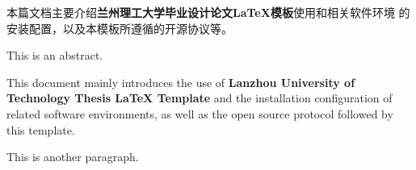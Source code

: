 
\begin{abstractzh}
	本篇文档主要介绍{\bf 兰州理工大学毕业设计论文\LaTeX{}模板}使用和相关软件环境
	的安装配置，以及本模板所遵循的开源协议等。
\end{abstractzh}

\begin{abstracten}
	This is an abstract.
	
	This document mainly introduces the use of {\bf Lanzhou University of 
	Technology Thesis \LaTeX{} Template} and the installation 
	configuration of related software environments, as well as the open
	source protocol followed by this template.
	
	This is another paragraph.
\end{abstracten}
